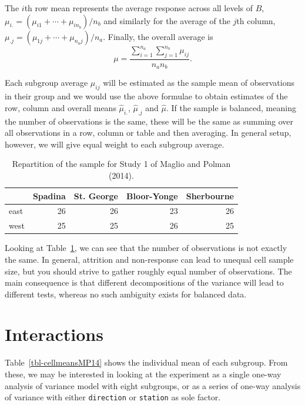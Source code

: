 \documentclass[
  11pt,
  letterpaper,
]{scrbook}
\theoremstyle{definition}
\theoremstyle{remark}
\begin{document}
The \(i\)th row mean represents the average response across all levels
of \(B\), \(\mu_{i.} = (\mu_{i1} + \cdots + \mu_{in_b})/n_b\) and
similarly for the average of the \(j\)th column,
\(\mu_{.j} = (\mu_{1j} + \cdots + \mu_{n_aj})/n_a.\) Finally, the
overall average is
\[\mu = \frac{\sum_{i=1}^{n_a} \sum_{j=1}^{n_b} \mu_{ij}}{n_an_b}.\]

Each subgroup average \(\mu_{ij}\) will be estimated as the sample mean
of observations in their group and we would use the above formulae to
obtain estimates of the row, column and overall means
\(\widehat{\mu}_{i.}\), \(\widehat{\mu}_{.j}\) and \(\widehat{\mu}\). If
the sample is balanced, meaning the number of observations is the same,
these will be the same as summing over all observations in a row, column
or table and then averaging. In general setup, however, we will give
equal weight to each subgroup average.

\hypertarget{tbl-balance-MP14}{}
\begin{table}
\caption{\label{tbl-balance-MP14}Repartition of the sample for Study 1 of Maglio and Polman (2014). }\tabularnewline

\centering
\begin{tabular}{lrrrr}
\toprule
  & Spadina & St. George & Bloor-Yonge & Sherbourne\\
\midrule
east & 26 & 26 & 23 & 26\\
west & 25 & 25 & 26 & 25\\
\bottomrule
\end{tabular}
\end{table}

Looking at Table~\ref{tbl-balance-MP14}, we can see that the number of
observations is not exactly the same. In general, attrition and
non-response can lead to unequal cell sample size, but you should strive
to gather roughly equal number of observations. The main consequence is
that different decompositions of the variance will lead to different
tests, whereas no such ambiguity exists for balanced data.

\hypertarget{interactions}{%
\section{Interactions}\label{interactions}}

Table~\ref{tbl-cellmeansMP14} shows the individual mean of each
subgroup. From these, we may be interested in looking at the experiment
as a single one-way analysis of variance model with eight subgroups, or
as a series of one-way analysis of variance with either
\texttt{direction} or \texttt{station} as sole factor.
\end{document}
